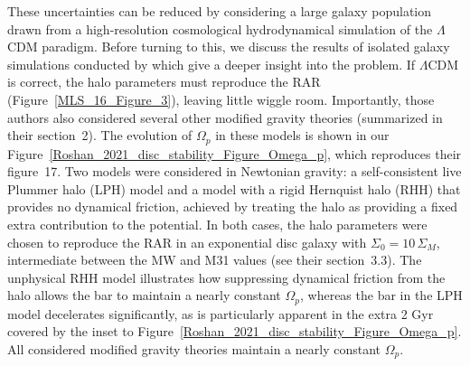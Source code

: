 \documentclass[fleqn,usenatbib,useAMS]{mnras} %
\begin{document}
These uncertainties can be reduced by considering a large galaxy population drawn from a high-resolution cosmological hydrodynamical simulation of the $\Lambda$CDM paradigm. Before turning to this, we discuss the results of isolated galaxy simulations conducted by \citet{Roshan_2021_disc_stability} which give a deeper insight into the problem. If $\Lambda$CDM is correct, the halo parameters must reproduce the RAR (Figure~\ref{MLS_16_Figure_3}), leaving little wiggle room. Importantly, those authors also considered several other modified gravity theories (summarized in their section~2). The evolution of $\Omega_p$ in these models is shown in our Figure~\ref{Roshan_2021_disc_stability_Figure_Omega_p}, which reproduces their figure~17. Two models were considered in Newtonian gravity: a self-consistent live Plummer halo (LPH) model and a model with a rigid Hernquist halo (RHH) that provides no dynamical friction, achieved by treating the halo as providing a fixed extra contribution to the potential. In both cases, the halo parameters were chosen to reproduce the RAR in an exponential disc galaxy with $\Sigma_0 = 10 \, \Sigma_M$, intermediate between the MW and M31 values (see their section~3.3). The unphysical RHH model illustrates how suppressing dynamical friction from the halo allows the bar to maintain a nearly constant $\Omega_p$, whereas the bar in the LPH model decelerates significantly, as is particularly apparent in the extra 2 Gyr covered by the inset to Figure~\ref{Roshan_2021_disc_stability_Figure_Omega_p}. All considered modified gravity theories maintain a nearly constant $\Omega_p$.
\end{document}
